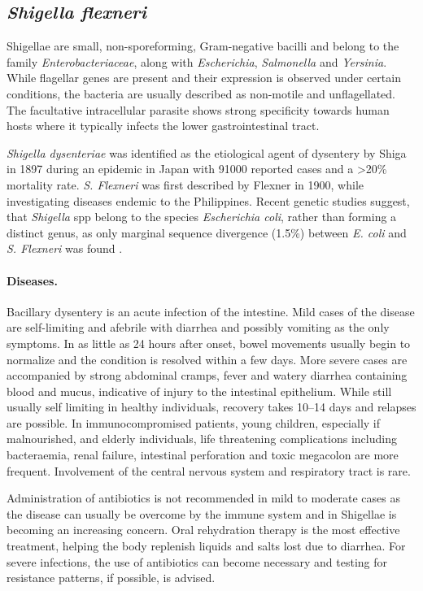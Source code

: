 \subsection{\textit{Shigella flexneri}}
Shigellae are small, non-sporeforming, Gram-negative bacilli and belong to the family \textit{Enterobacteriaceae}, along with \textit{Escherichia}, \textit{Salmonella} and \textit{Yersinia}. While flagellar genes are present and their expression is observed under certain conditions, the bacteria are usually described as non-motile and unflagellated. The facultative intracellular parasite shows strong specificity towards human hosts where it typically infects the lower gastrointestinal tract.

\textit{Shigella dysenteriae} was identified as the etiological agent of dysentery by Shiga in 1897 during an epidemic in Japan with 91000 reported cases and a \textgreater 20\% mortality rate. \textit{S. Flexneri} was first described by Flexner in 1900, while investigating diseases endemic to the Philippines. Recent genetic studies suggest, that \textit{Shigella} \acrshort{spp} belong to the species \textit{Escherichia coli}, rather than forming a distinct genus, as only marginal sequence divergence (1.5\%) between \textit{E. coli} and \textit{S. Flexneri} was found \citep{Schroeder2008,Croxen2010}.

\paragraph{Diseases.}
Bacillary dysentery is an acute infection of the intestine. Mild cases of the disease are self-limiting and afebrile with diarrhea and possibly vomiting as the only symptoms. In as little as 24 hours after onset, bowel movements usually begin to normalize and the condition is resolved within a few days. More severe cases are accompanied by strong abdominal cramps, fever and watery diarrhea containing blood and mucus, indicative of injury to the intestinal epithelium. While still usually self limiting in healthy individuals, recovery takes 10--14 days and relapses are possible. In immunocompromised patients, young children, especially if malnourished, and elderly individuals, life threatening complications including bacteraemia, renal failure, intestinal perforation and toxic megacolon are more frequent. Involvement of the central nervous system and respiratory tract is rare.

Administration of antibiotics is not recommended in mild to moderate cases as the disease can usually be overcome by the immune system and  in Shigellae is becoming an increasing concern. Oral rehydration therapy is the most effective treatment, helping the body replenish liquids and salts lost due to diarrhea. For severe infections, the use of antibiotics can become necessary and testing for resistance patterns, if possible, is advised.

